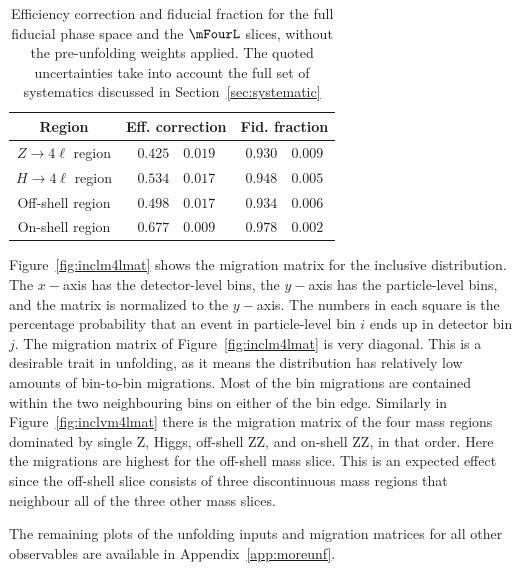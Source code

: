  \begin{table}[ht]
     \centering
     \begin{tabular} { c | r@{$\pm$} l  r@{$\pm$}l }
      \hline
     Region & \multicolumn{2}{c}{Eff. correction}  & \multicolumn{2}{c}{Fid. fraction}   \\
       \hline
       $Z\to 4\ell$ region  & $0.425$ & $0.019$ & $0.930$ & $0.009$ \\
       $H\to 4\ell$ region  & $0.534$ & $0.017$ & $0.948$ & $0.005$ \\
       Off-shell region & $0.498$ & $0.017$ & $0.934$ & $0.006$ \\
       On-shell region  & $0.677$ & $0.009$ & $0.978$ & $0.002$ \\
       \hline
    \end{tabular}
   \caption{Efficiency correction and fiducial fraction for the full fiducial phase space and the $\mFourL$ slices, without the pre-unfolding weights applied. The quoted uncertainties take into account the full set of systematics discussed in Section~\ref{sec:systematic} \label{tab:fidxsunf-nopreunfold} }
 \end{table}

Figure~\ref{fig:inclm4lmat} shows the migration matrix for the inclusive \mFourL{} distribution. The $x-$axis has the detector-level bins, the $y-$axis has the particle-level bins, and the matrix is normalized to the $y-$axis. The numbers in each square is the percentage probability that an event in particle-level bin $i$ ends up in detector bin $j$. The migration matrix of Figure~\ref{fig:inclm4lmat} is very diagonal. This is a desirable trait in unfolding, as it means the distribution has relatively low amounts of bin-to-bin migrations. Most of the bin migrations are contained within the two neighbouring bins on either of the bin edge.  Similarly in Figure~\ref{fig:inclvm4lmat} there is the migration matrix of the four mass regions dominated by single Z, Higgs,  off-shell ZZ, and on-shell ZZ, in that order. Here the migrations are highest for the off-shell mass slice. This is an expected effect since the off-shell slice consists of three discontinuous mass regions that neighbour all of the three other mass slices. 

The remaining plots of the unfolding inputs and migration matrices for all other observables are available in Appendix~\ref{app:moreunf}.


